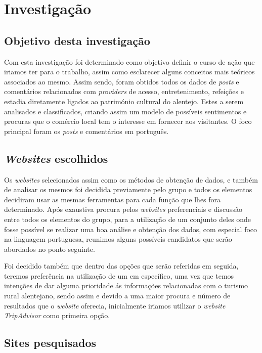 \chapter{Investigação}
\section{Objetivo desta investigação}

Com esta investigação foi determinado como objetivo definir o curso de ação que iriamos ter para o trabalho, assim como esclarecer alguns conceitos mais teóricos associados ao mesmo. 
Assim sendo, foram obtidos todos os dados de \textit{posts} e comentários relacionados com \textit{providers} de acesso, entretenimento, refeições e estadia diretamente ligados ao património cultural do alentejo. Estes a serem analisados e classificados, criando assim um modelo de possíveis sentimentos e procuras que o comércio local tem o interesse em fornecer aos visitantes. O foco principal foram os \textit{posts} e comentários em português.

\section{\textit{Websites} escolhidos}

Os \textit{websites} selecionados assim como os métodos de obtenção de dados, e também de analisar os mesmos foi decidida previamente pelo grupo e todos os elementos decidiram usar as mesmas ferramentas para cada função que lhes fora determinado.
Após exaustiva procura pelos \textit{websites} preferenciais e discussão entre todos os elementos do grupo, para a utilização de um conjunto deles onde fosse possível se realizar uma boa análise e obtenção dos dados, com especial foco na linguagem portuguesa, reunimos alguns possíveis candidatos que serão abordados no ponto seguinte.

Foi decidido também que dentro das opções que serão referidas em seguida, teremos preferência na utilização de um em específico, uma vez que temos intenções de dar alguma prioridade ás informações relacionadas com o turismo rural alentejano, sendo assim e devido a uma maior procura e número de resultados que o \textit{website} oferecia, inicialmente iriamos utilizar o \textit{website TripAdvisor} como primeira opção.

\section{Sites pesquisados}

